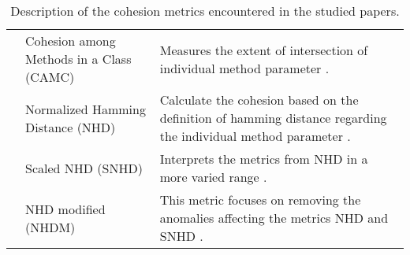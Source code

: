 \begin{table*}[t]
\begin{tabular}{p{2cm} p{4cm} p{10cm}}
                \cmidrule(rl){2-3}& Cohesion among Methods in a Class (CAMC) & Measures the extent of intersection of individual method parameter \cite{s118_cohesion}. \\
                \cmidrule(rl){2-3}& Normalized Hamming Distance (NHD) & Calculate the cohesion based on the definition of hamming distance regarding the individual method parameter \cite{s118_cohesion}. \\
                \cmidrule(rl){2-3}& Scaled NHD (SNHD) & Interprets the metrics from NHD in a more varied range \cite{s118_cohesion}. \\
                \cmidrule(rl){2-3}& NHD modified (NHDM) & This metric focuses on removing the anomalies affecting the metrics NHD and SNHD \cite{s118_cohesion}. \\
                
        \bottomrule
        
    \end{tabular}
    
    \caption{Description of the cohesion metrics encountered in the studied papers.}
    \label{table:cohesion_metrics}
    
\end{table*}
